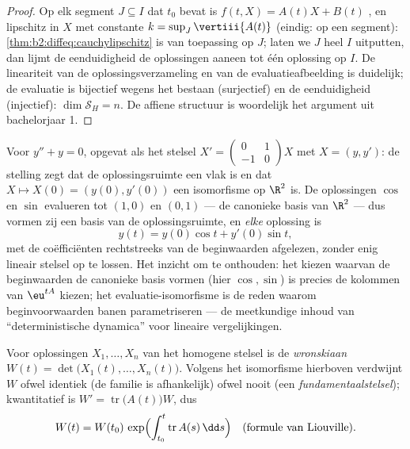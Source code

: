\begin{proof}
Op elk segment $J \subseteq I$ dat $t_0$ bevat is $f(t, X) = A(t)X
+ B(t)$ , en lipschitz in $X$ met constante $k = \sup_J
\vertiii{A(t)}$ (eindig:  op een segment):
\cref{thm:b2:diffeq:cauchylipschitz} is van toepassing op $J$;
laten we $J$ heel $I$ uitputten, dan lijmt de eenduidigheid de
oplossingen aaneen tot één oplossing op $I$. De lineariteit van de
oplossingsverzameling en van de evaluatieafbeelding is duidelijk;
de evaluatie is bijectief wegens het bestaan (surjectief) en de
eenduidigheid (injectief): $\dim \mathcal{S}_H = n$. De affiene
structuur is woordelijk het argument uit bachelorjaar 1.
\end{proof}

\begin{example}\label{ex:b2:diffeq:evaliso}
Voor $y'' + y = 0$, opgevat als het stelsel $X' = \begin{pmatrix} 0
& 1\\ -1 & 0\end{pmatrix}X$ met $X = (y, y')$: de stelling zegt dat
de oplossingsruimte een vlak is en dat $X \mapsto X(0) = (y(0),
y'(0))$ een isomorfisme op $\R^2$ is. De oplossingen $\cos$ en
$\sin$ evalueren tot $(1, 0)$ en $(0, 1)$ --- de canonieke basis
van $\R^2$ --- dus vormen zij een basis van de oplossingsruimte, en
\emph{elke} oplossing is
\[
y(t) = y(0)\cos t + y'(0)\sin t ,
\]
met de coëfficiënten rechtstreeks van de beginwaarden afgelezen,
zonder enig lineair stelsel op te lossen. Het inzicht om te
onthouden: het  kiezen waarvan de beginwaarden
de canonieke basis vormen (hier $\cos, \sin$) is precies de
kolommen van $\eu^{tA}$ kiezen; het evaluatie-isomorfisme is de
reden waarom beginvoorwaarden banen parametriseren --- de
meetkundige inhoud van ``deterministische dynamica'' voor lineaire
vergelijkingen.
\end{example}

\begin{definition}[Wronskiaan]\label{def:b2:diffeq:wronskian}
Voor oplossingen $X_1, \dots, X_n$ van het homogene stelsel is de
\emph{wronskiaan} $W(t) = \det\bigl(X_1(t),
\dots, X_n(t)\bigr)$. Volgens het isomorfisme hierboven verdwijnt
$W$ ofwel identiek (de familie is afhankelijk) ofwel nooit (een
\emph{fundamentaalstelsel});
kwantitatief is $W' = \operatorname{tr}\bigl(A(t)\bigr) W$, dus
\[
W(t) = W(t_0)\,\exp\Bigl(\int_{t_0}^{t}
\operatorname{tr} A(s)\,\dd s\Bigr)
\quad \text{(formule van Liouville)}.
\]
\end{definition}

